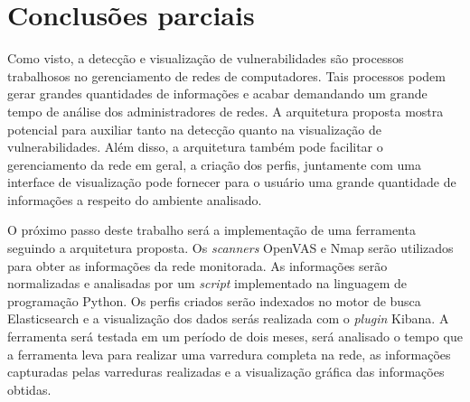 \chapter{Conclusões parciais}
Como visto, a detecção e visualização de vulnerabilidades são processos trabalhosos no gerenciamento de redes de computadores. Tais processos podem gerar grandes quantidades de informações e acabar demandando um grande tempo de análise dos administradores de redes. A arquitetura proposta mostra potencial para auxiliar tanto  na detecção quanto na  visualização de vulnerabilidades. Além disso, a arquitetura também pode facilitar o gerenciamento da rede em geral, a criação dos perfis, juntamente com uma interface de visualização pode fornecer para o usuário uma grande quantidade de informações a respeito do ambiente analisado.

O próximo passo deste trabalho será a implementação de uma ferramenta seguindo a arquitetura proposta. Os \textit{scanners} \gls{OpenVAS} e \gls{Nmap} serão utilizados para obter as informações da rede monitorada. As informações serão normalizadas e analisadas por um \textit{script} implementado na linguagem de programação Python. Os perfis criados serão indexados no motor de busca Elasticsearch e a visualização dos dados serás realizada com o \textit{plugin} Kibana. A ferramenta será testada em um período de dois meses, será analisado o tempo que a ferramenta leva para realizar uma varredura completa na rede, as informações capturadas pelas varreduras realizadas e a visualização gráfica das informações obtidas.
